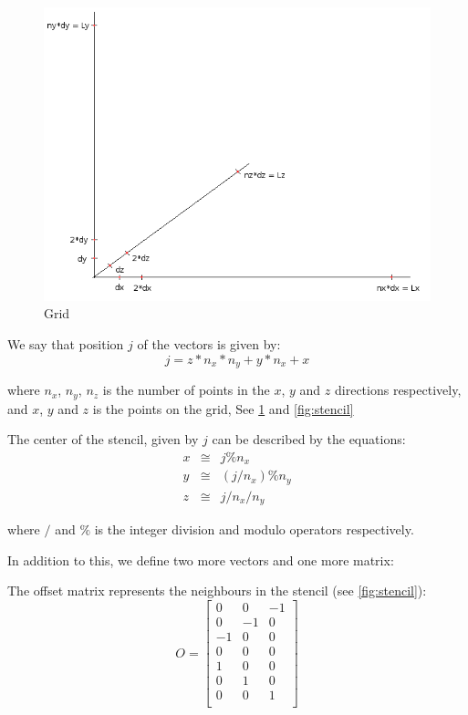 \begin{figure}[!h]
  \begin{center}
    \includegraphics[width=0.5\linewidth]{grid.png}
  \end{center}
  \caption{Grid}
  \label{fig:grid}
\end{figure}

We say that position $j$ of the vectors is given by:
\begin{equation}
j = z*n_x*n_y + y*n_x + x
\end{equation}

where $n_x$, $n_y$, $n_z$ is the number of points in the $x$, $y$ and $z$ directions
respectively, and $x$, $y$ and $z$ is the points on the grid, See \cref{fig:grid} and
\cref{fig:stencil}

The center of the stencil, given by $j$ can be described by the equations:
\begin{eqnarray}
  x & \cong & j\%n_x \\
  y & \cong & (j/n_x)\%n_y \\
  z & \cong & j/n_x/n_y 
\end{eqnarray}

where $/$ and $ \% $ is the integer division and modulo operators respectively.

In addition to this, we define two more vectors and one more matrix:

The offset matrix represents the neighbours in the stencil (see \cref{fig:stencil}):
\begin{equation}
O =
\left[
\begin{array}{ccc}
0 & 0 & -1 \\
0 & -1 & 0 \\
-1 & 0 & 0 \\
0 & 0 & 0 \\
1 & 0 & 0 \\
0 & 1 & 0 \\
0 & 0 & 1 \\
\end{array}
\right]
\end{equation}

